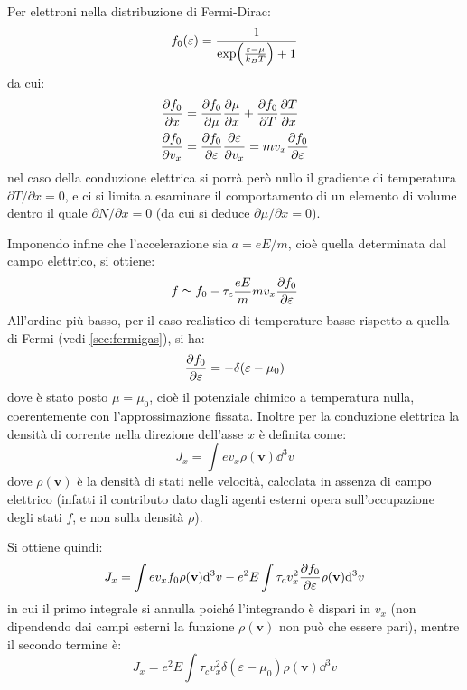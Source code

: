 Per elettroni nella distribuzione di Fermi-Dirac:
\begin{equation*}
f_0 (\varepsilon) = \frac{1}{\exp(\frac{\varepsilon - \mu}{k_B T}) + 1}
\end{equation*}
da cui:
\begin{align*}
\frac{\partial {f_0}}{\partial {x}} &= \frac{\partial {f_0}}{\partial {\mu}} \frac{\partial {\mu}}{\partial {x}} + \frac{\partial {f_0}}{\partial {T}} \frac{\partial {T}}{\partial {x}}\\
\frac{\partial {f_0}}{\partial {v_x}} &= \frac{\partial {f_0}}{\partial {\varepsilon}} \frac{\partial {\varepsilon}}{\partial {v_x}} = m v_x \frac{\partial {f_0}}{\partial {\varepsilon}}
\end{align*}
nel caso della conduzione elettrica si porrà però nullo il gradiente di temperatura $ \partial T / \partial x = 0 $, e ci si limita a esaminare il comportamento di un elemento di volume dentro il quale $ \partial N / \partial x = 0 $ (da cui si deduce $ \partial \mu / \partial x = 0$).

Imponendo infine che l'accelerazione sia $ a = e E / m $, cioè quella determinata dal campo elettrico, si ottiene:
\begin{equation*}
f \simeq f_0 - \tau_c \frac{e E}{m} m v_x \frac{\partial {f_0}}{\partial {\varepsilon}}
\end{equation*}
All'ordine più basso, per il caso realistico di temperature basse rispetto a quella di Fermi (vedi \cref{sec:fermigas}), si ha:
\begin{equation*}
\frac{\partial {f_0}}{\partial {\varepsilon}} = - \delta (\varepsilon - \mu_0)
\end{equation*}
dove è stato posto $ \mu = \mu_0  $, cioè il potenziale chimico a temperatura nulla, coerentemente con l'approssimazione fissata.
Inoltre per la conduzione elettrica la densità di corrente nella direzione dell'asse $ x $ è definita come:
\begin{equation*}
J_x = \int e v_x \rho(\textbf{v}) \dd^3 v
\end{equation*}
dove $ \rho(\textbf{v}) $ è la densità di stati nelle velocità, calcolata in assenza di campo elettrico (infatti il contributo dato dagli agenti esterni opera sull'occupazione degli stati $ f $, e non sulla densità $ \rho $).

Si ottiene quindi:
\begin{equation*}
J_x = \int e v_x f_0 \rho(\textbf{v}) \dd^3 v - e^2 E \int \tau_c v_x ^2 \frac{\partial {f_0}}{\partial {\varepsilon}} \rho(\textbf{v}) \dd^3 v
\end{equation*}
in cui il primo integrale si annulla poiché l'integrando è dispari in $ v_x $ (non dipendendo dai campi esterni la funzione $ \rho(\textbf{v}) $ non può che essere pari), mentre il secondo termine è:
\begin{equation*}
J_x = e^2 E \int \tau_c  v_x ^2 \delta (\varepsilon - \mu_0) \rho(\textbf{v}) \dd^3 v
\end{equation*}

